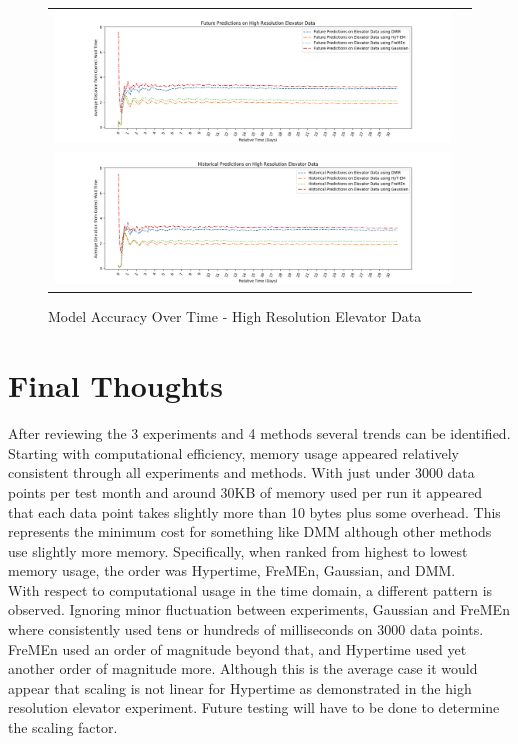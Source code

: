 \begin{center}
\begin{center}
\begin{figure}[!Hp]
  \begin{tabular}{cc}
    {\includegraphics[width = 6in]{images/results/Future_Predictions_on_High_Resolution_Elevator_Data.png}} \\
    {\includegraphics[width = 6in]{images/results/Historical_Predictions_on_High_Resolution_Elevator_Data.png}} \\
  \end{tabular}
  \caption{Model Accuracy Over Time - High Resolution Elevator Data}
  \label{figure:Model_Accuracy_Over_Time_High_Resolution_Elevator_Data}
\end{figure}
\end{center}


\section{ Final Thoughts }

After reviewing the 3 experiments and 4 methods several trends can be
identified. Starting with computational efficiency, memory usage appeared
relatively consistent through all experiments and methods. With just under 3000
data points per test month and around 30KB of memory used per run
it appeared that each data point takes slightly more than 10 bytes plus
some overhead. This represents the minimum cost for something like DMM although
other methods use slightly more memory. Specifically, when ranked from highest to lowest memory usage,
the order was Hypertime, FreMEn, Gaussian, and DMM. \\

With respect to computational usage in the time domain, a different pattern is
observed. Ignoring minor fluctuation between experiments, Gaussian and FreMEn
where consistently used tens or hundreds of milliseconds on 3000 data points.
FreMEn used an order of magnitude beyond that, and Hypertime used yet another
order of magnitude more. Although this is the average case it would appear that
scaling is not linear for Hypertime as demonstrated in the high resolution
elevator experiment. Future testing will have to be done to determine the
scaling factor. \\


\end{center}
